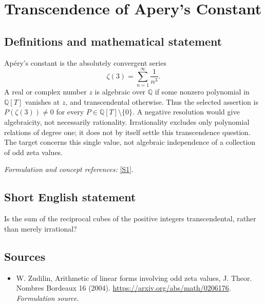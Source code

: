 \documentclass[11pt]{article}
\begin{document}
\section*{\texorpdfstring{Transcendence of Apery's Constant}{Transcendence of Apery's Constant}}\label{184}
\subsection{Definitions and mathematical statement}
Ap\'ery's constant is the absolutely convergent series
\[
 \zeta(3)=\sum_{n=1}^{\infty}\frac1{n^3}.
\]
A real or complex number $z$ is algebraic over ${\mathbb{Q}}$ if some nonzero polynomial in ${\mathbb{Q}}[T]$ vanishes at $z$, and transcendental otherwise. Thus the selected assertion is
$P(\zeta(3))\ne0$ for every $P\in{\mathbb{Q}}[T]\setminus\{0\}$.
A negative resolution would give algebraicity, not necessarily rationality. Irrationality excludes only polynomial relations of degree one; it does not by itself settle this transcendence question. The target concerns this single value, not algebraic independence of a collection of odd zeta values.
\par\smallskip\textit{Formulation and concept references:} \href{https://arxiv.org/abs/math/0206176}{[S1]}.

\subsection{Short English statement}
Is the sum of the reciprocal cubes of the positive integers transcendental, rather than merely irrational?
\subsection{Sources}
\begin{itemize}
\item[S1]W. Zudilin, Arithmetic of linear forms involving odd zeta values, J. Theor. Nombres Bordeaux 16 (2004).
\url{https://arxiv.org/abs/math/0206176}.
\textit{Formulation source.}
\end{itemize}
\end{document}
